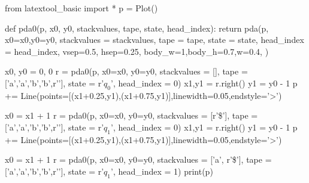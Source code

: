 \begin{python}
from latextool_basic import *
p = Plot()

def pda0(p, x0, y0, stackvalues, tape, state, head_index):
    return pda(p,
           x0=x0,y0=y0,
           stackvalues = stackvalues,
           tape = tape,
           state = state,
           head_index = head_index,
           vsep=0.5, hsep=0.25,
           body_w=1,body_h=0.7,w=0.4,
           )

x0, y0 = 0, 0
r = pda0(p, x0=x0, y0=y0,
         stackvalues = [], tape = ['a','a','b','b',r'\SPACE'],
         state = r'$q_0$', head_index = 0)
x1,y1 = r.right()
y1 = y0 - 1
p += Line(points=[(x1+0.25,y1),(x1+0.75,y1)],linewidth=0.05,endstyle='>')

x0 = x1 + 1
r = pda0(p, x0=x0, y0=y0,
        stackvalues = [r'\$'], tape = ['a','a','b','b',r'\SPACE'],
        state = r'$q_1$', head_index = 0)
x1,y1 = r.right()
y1 = y0 - 1
p += Line(points=[(x1+0.25,y1),(x1+0.75,y1)],linewidth=0.05,endstyle='>')

x0 = x1 + 1
r = pda0(p, x0=x0, y0=y0,
    stackvalues = ['a', r'\$'], tape = ['a','a','b','b',r'\SPACE'],
    state = r'$q_1$', head_index = 1)
print(p)
\end{python}

